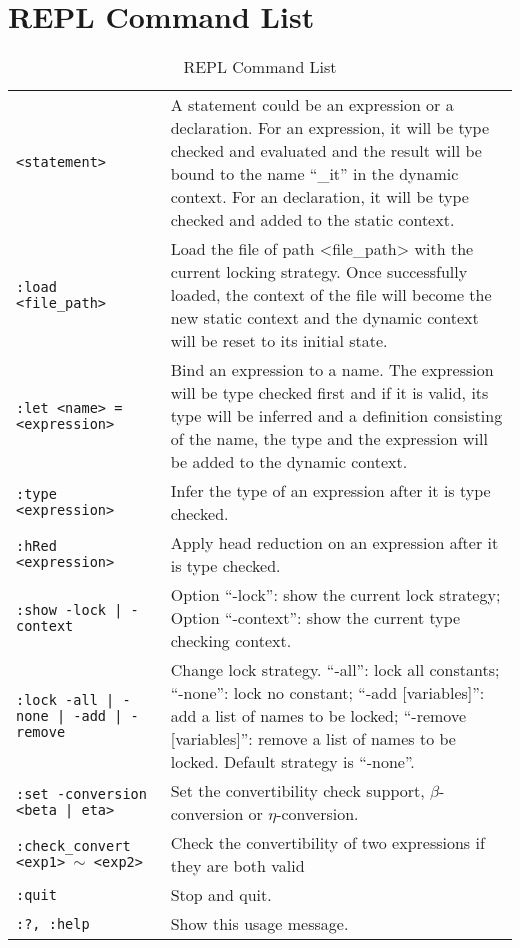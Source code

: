 \section{REPL Command List}\label{apdix:command}
\begin{table}[h]
  \centering
  \footnotesize
  \begin{tabular}{l p{10cm}}
    \texttt{<statement>} & A statement could be an expression or a declaration. \newline For an expression,  it will be type checked and evaluated and the result will be bound to the name ``\_it'' in the dynamic context. \newline For an declaration, it will be type checked and added to the static context.\\
    \texttt{:load <file\_path>} & Load the file of path <file\_path> with the current locking strategy. Once successfully loaded, the context of the file will become the new static context and the dynamic context will be reset to its initial state. \\
    \texttt{:let  <name> = <expression>} & Bind an expression to a name. The expression will be type checked first and if it is valid, its type will be inferred and a definition consisting of the name, the type and the expression will be added to the dynamic context. \\
    \texttt{:type <expression>} & Infer the type of an expression after it is type checked. \\
    \texttt{:hRed <expression>} & Apply head reduction on an expression after it is type checked. \\
    \texttt{:show {-lock | -context}} & Option ``-lock'': show the current lock strategy; \newline Option ``-context'': show the current type checking context. \\
    \texttt{:lock {-all | -none | -add | -remove}} & Change lock strategy. ``-all'': lock all constants; ``-none'': lock no constant; ``-add [variables]'': add a list of names to be locked; ``-remove [variables]'': remove a list of names to be locked. Default strategy is ``-none''. \\
    \texttt{:set {-conversion <beta | eta>}} & Set the convertibility check support, $\beta$-conversion or $\eta$-conversion. \\
    \texttt{:check\_convert <exp1> $\sim$ <exp2>} & Check the convertibility of two expressions if they are both valid \\ 
    \texttt{:quit}     & Stop and quit. \\
    \texttt{:?, :help} & Show this usage message. \\
  \end{tabular}
  \caption{REPL Command List}
  \label{result:tab:commands}
\end{table}
